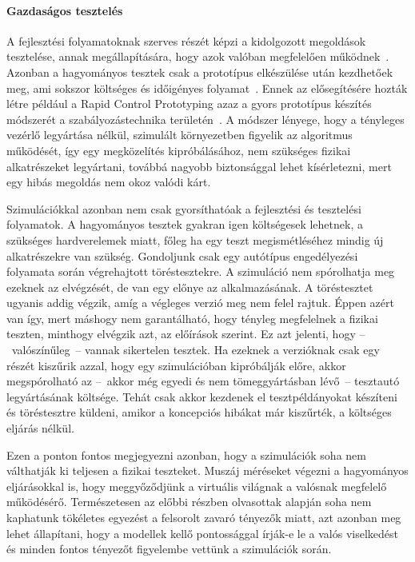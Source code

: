         \paragraph{Gazdaságos tesztelés}
        A fejlesztési folyamatoknak szerves részét képzi a kidolgozott megoldások tesztelése, annak megállapítására, hogy azok valóban megfelelően működnek~\cite{Bajaj_2022}.
        Azonban a hagyományos tesztek csak a prototípus elkészülése után kezdhetőek meg, ami sokszor költséges és időigényes folyamat~\cite{Gianni2017}. Ennek az elősegítésére hozták létre például a Rapid Control Prototyping azaz a gyors prototípus készítés módszerét a szabályozástechnika területén~\cite{SpeedgoatGmbH}.
        A módszer lényege, hogy a tényleges vezérlő legyártása nélkül, szimulált környezetben figyelik az algoritmus működését, így egy megközelítés kipróbálásához, nem szükséges fizikai alkatrészeket legyártani, továbbá nagyobb biztonsággal lehet kísérletezni, mert egy hibás megoldás nem okoz valódi kárt.
        
        Szimulációkkal azonban nem csak gyorsíthatóak a fejlesztési és tesztelési folyamatok. A hagyományos tesztek gyakran igen költségesek lehetnek, a szükséges hardverelemek miatt, főleg ha egy teszt megismétléséhez mindig új alkatrészekre van szükség.
        Gondoljunk csak egy autótípus engedélyezési folyamata során végrehajtott töréstesztekre.
        A szimuláció nem spórolhatja meg ezeknek az elvégzését, de van egy előnye az alkalmazásának.
        A töréstesztet ugyanis addig végzik, amíg a végleges verzió meg nem felel rajtuk. Éppen azért van így, mert máshogy nem garantálható, hogy tényleg megfelelnek a fizikai teszten, minthogy elvégzik azt, az előírások szerint.
        Ez azt jelenti, hogy --~valószínűleg~-- vannak sikertelen tesztek. Ha ezeknek a verzióknak csak egy részét kiszűrik azzal, hogy egy szimulációban kipróbálják előre, akkor megspórolható az --~akkor még egyedi és nem tömeggyártásban lévő~-- tesztautó legyártásának költsége.
        Tehát csak akkor kezdenek el tesztpéldányokat készíteni és töréstesztre küldeni, amikor a koncepciós hibákat már kiszűrték, a költséges eljárás nélkül.
        
        Ezen a ponton fontos megjegyezni azonban, hogy a szimulációk soha nem válthatják ki teljesen a fizikai teszteket.
        Muszáj méréseket végezni a hagyományos eljárásokkal is, hogy meggyőződjünk a virtuális világnak a valósnak megfelelő működésérő. Természetesen az előbbi részben olvasottak alapján soha nem kaphatunk tökéletes egyezést a felsorolt zavaró tényezők miatt, azt azonban meg lehet állapítani, hogy a modellek kellő pontossággal írják-e le a valós viselkedést és minden fontos tényezőt figyelembe vettünk a szimulációk során.
        
